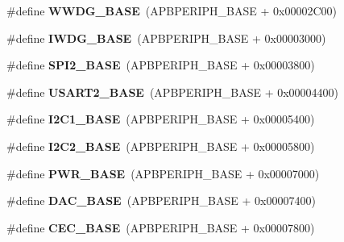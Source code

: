 \begin{DoxyCompactItemize}
\#define {\bfseries W\+W\+D\+G\+\_\+\+B\+A\+SE}~(A\+P\+B\+P\+E\+R\+I\+P\+H\+\_\+\+B\+A\+SE + 0x00002\+C00)
\item 
\mbox{\label{group___peripheral__memory__map_ga8543ee4997296af5536b007cd4748f55}} 
\#define {\bfseries I\+W\+D\+G\+\_\+\+B\+A\+SE}~(A\+P\+B\+P\+E\+R\+I\+P\+H\+\_\+\+B\+A\+SE + 0x00003000)
\item 
\mbox{\label{group___peripheral__memory__map_gac3e357b4c25106ed375fb1affab6bb86}} 
\#define {\bfseries S\+P\+I2\+\_\+\+B\+A\+SE}~(A\+P\+B\+P\+E\+R\+I\+P\+H\+\_\+\+B\+A\+SE + 0x00003800)
\item 
\mbox{\label{group___peripheral__memory__map_gade83162a04bca0b15b39018a8e8ec090}} 
\#define {\bfseries U\+S\+A\+R\+T2\+\_\+\+B\+A\+SE}~(A\+P\+B\+P\+E\+R\+I\+P\+H\+\_\+\+B\+A\+SE + 0x00004400)
\item 
\mbox{\label{group___peripheral__memory__map_gacd72dbffb1738ca87c838545c4eb85a3}} 
\#define {\bfseries I2\+C1\+\_\+\+B\+A\+SE}~(A\+P\+B\+P\+E\+R\+I\+P\+H\+\_\+\+B\+A\+SE + 0x00005400)
\item 
\mbox{\label{group___peripheral__memory__map_ga04bda70f25c795fb79f163b633ad4a5d}} 
\#define {\bfseries I2\+C2\+\_\+\+B\+A\+SE}~(A\+P\+B\+P\+E\+R\+I\+P\+H\+\_\+\+B\+A\+SE + 0x00005800)
\item 
\mbox{\label{group___peripheral__memory__map_gac691ec23dace8b7a649a25acb110217a}} 
\#define {\bfseries P\+W\+R\+\_\+\+B\+A\+SE}~(A\+P\+B\+P\+E\+R\+I\+P\+H\+\_\+\+B\+A\+SE + 0x00007000)
\item 
\mbox{\label{group___peripheral__memory__map_gad18d0b914c7f68cecbee1a2d23a67d38}} 
\#define {\bfseries D\+A\+C\+\_\+\+B\+A\+SE}~(A\+P\+B\+P\+E\+R\+I\+P\+H\+\_\+\+B\+A\+SE + 0x00007400)
\item 
\mbox{\label{group___peripheral__memory__map_gaacb77bc44b3f8c87ab98f241e760e440}} 
\#define {\bfseries C\+E\+C\+\_\+\+B\+A\+SE}~(A\+P\+B\+P\+E\+R\+I\+P\+H\+\_\+\+B\+A\+SE + 0x00007800)

\end{DoxyCompactItemize}
